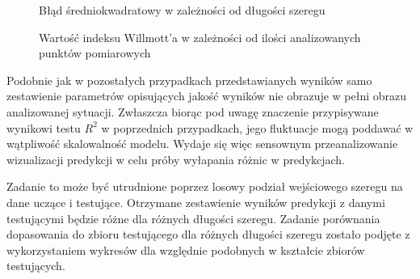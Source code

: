 \documentclass[10pt,a4paper]{article}
\begin{document}
\begin{figure}[!ht]
\centering
{}
\caption{Błąd średniokwadratowy w zależności od długości szeregu}
\label{figure:scale_mse}
\end{figure}
\FloatBarrier

\begin{figure}[!ht]
	\centering
	\caption{Wartość indeksu Willmott'a w zależności od ilości analizowanych punktów pomiarowych}
	\label{figure:scale_willmott}
\end{figure}
\FloatBarrier

Podobnie jak w pozostałych przypadkach przedstawianych wyników samo zestawienie parametrów opisujących jakość wyników nie obrazuje w pełni obrazu analizowanej sytuacji. Zwłaszcza biorąc pod uwagę znaczenie przypisywane wynikowi testu $R^2$ w poprzednich przypadkach, jego fluktuacje mogą poddawać w wątpliwość skalowalność modelu. Wydaje się więc sensownym przeanalizowanie wizualizacji predykcji w celu próby wyłapania różnic w predykcjach. 

Zadanie to może być utrudnione poprzez losowy podział wejściowego szeregu na dane uczące i testujące. Otrzymane zestawienie wyników predykcji z danymi testującymi będzie różne dla różnych długości szeregu. Zadanie porównania dopasowania do zbioru testującego dla różnych długości szeregu zostało podjęte z wykorzystaniem wykresów dla względnie podobnych w kształcie zbiorów testujących. 
\end{document}
